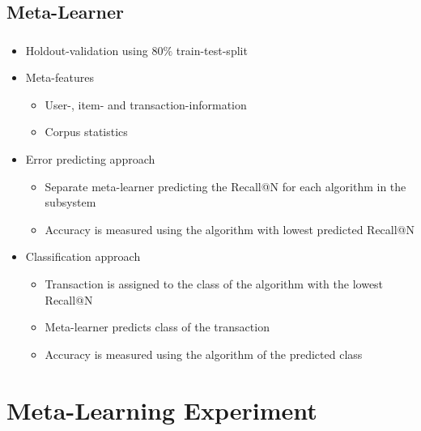 \documentclass[aspectratio=169]{beamer}
\begin{document}
\subsection{Meta-Learner}
\begin{frame}
	\frametitle{\insertsection}
	\framesubtitle{\insertsubsection}

	\begin{itemize}
		\item Holdout-validation using $80\%$ train-test-split
		\item Meta-features
		\begin{itemize}
			\item User-, item- and transaction-information
			\item Corpus statistics
		\end{itemize}
		\item Error predicting approach
		\begin{itemize}
			\item Separate meta-learner predicting the Recall@N for each algorithm in the subsystem
			\item Accuracy is measured using the algorithm with lowest predicted Recall@N
		\end{itemize}
		\item Classification approach
		\begin{itemize}
			\item Transaction is assigned to the class of the algorithm with the lowest Recall@N
			\item Meta-learner predicts class of the transaction
			\item Accuracy is measured using the algorithm of the predicted class
		\end{itemize}
	\end{itemize}
\end{frame}

\section[Results]{Meta-Learning Experiment}
\frame{\vfill\centering\tableofcontents[sectionstyle=show/shaded,subsectionstyle=show/hide]\vfill}
\end{document}
